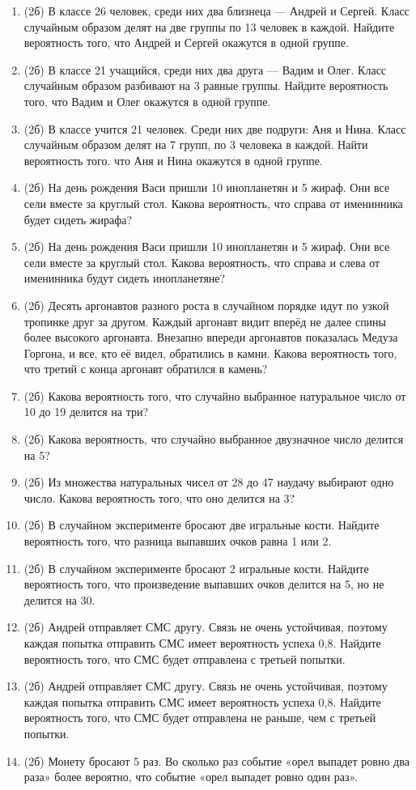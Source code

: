 \documentclass[a4paper, 12pt]{article}
\begin{document}
\begin{enumerate}
\item (2б) В классе 26 человек, среди них два близнеца — Андрей и Сергей. Класс случайным образом делят на две группы по 13 человек в каждой. 
Найдите вероятность того, что Андрей и Сергей окажутся в одной группе. 
\item (2б) В классе 21 учащийся, среди них два друга — Вадим и Олег. Класс случайным образом разбивают на 3 равные группы. Найдите вероятность того, 
что Вадим и Олег окажутся в одной группе. 
\item (2б) В классе учится 21 человек. Среди них две подруги: Аня и Нина. Класс случайным образом делят на 7 групп, по 3 человека в каждой. 
Найти вероятность того. что Аня и Нина окажутся в одной группе. 
\item (2б) На день рождения Васи пришли 10 инопланетян и 5 жираф. Они все сели вместе за круглый стол. 
Какова вероятность, что справа от именинника будет сидеть жирафа? 
\item (2б) На день рождения Васи пришли 10 инопланетян и 5 жираф. Они все сели вместе за круглый стол. 
Какова вероятность, что справа и слева от именинника будут сидеть инопланетяне? 
\item (2б) Десять аргонавтов разного роста в случайном порядке идут по узкой тропинке друг за другом. 
Каждый аргонавт видит вперёд не далее спины более высокого аргонавта. 
Внезапно впереди аргонавтов показалась Медуза Горгона, и все, кто её видел, обратились в камни. 
Какова вероятность того, что третий с конца аргонавт обратился в камень? 
\item (2б) Какова вероятность того, что случайно выбранное натуральное число от 10 до 19 делится на три? 
\item (2б) Какова вероятность, что случайно выбранное двузначное число делится на 5? 
\item (2б) Из множества натуральных чисел от 28 до 47 наудачу выбирают одно число. Какова вероятность того, что оно делится на 3? 
\item (2б) В случайном эксперименте бросают две игральные кости. Найдите вероятность того, что разница выпавших очков равна 1 или 2. 
\item (2б) В случайном эксперименте бросают 2 игральные кости. Найдите вероятность того, что произведение выпавших очков делится на 5, 
но не делится на 30. 
\item (2б) Андрей отправляет СМС другу. Связь не очень устойчивая, поэтому каждая попытка отправить СМС имеет вероятность успеха 0,8. 
Найдите вероятность того, что СМС будет отправлена с третьей попытки. 
\item (2б) Андрей отправляет СМС другу. Связь не очень устойчивая, поэтому каждая попытка отправить СМС имеет вероятность успеха 0,8. 
Найдите вероятность того, что СМС будет отправлена не раньше, чем с третьей попытки. 
\item (2б) Монету бросают 5 раз. Во сколько раз событие «орел выпадет ровно два раза» более вероятно, что событие «орел выпадет ровно один раз». 


\end{enumerate}
\end{document}
